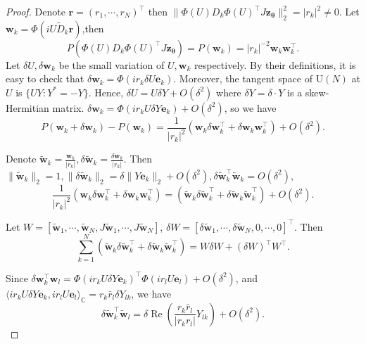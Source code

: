 \documentclass[10pt,a4paper]{amsart}
\newcommand{\CC}{\mathbb{C}}
\begin{document}
\begin{proof}
    Denote $\bm r=(r_1,\cdots,r_N)^\top$ then $\|\Phi(U) D_k\Phi(U)^\top J\bm{z}_{\bm\theta}\|_2^2=|r_k|^2\neq 0$. Let $\bm{w}_k=\Phi(iU\tilde D_k\bm r)$,then
\begin{equation}
    P(\Phi(U) D_k\Phi(U)^\top J\bm{z}_{\bm\theta})=P(\bm{w}_k)=|r_k|^{-2}\bm{w}_k\bm{w}_k^\top.
\end{equation}
 Let $\delta U,\delta\bm{w}_k$ be the small variation of $U,\bm{w}_k$ respectively. By their definitions, it is easy to check that $\delta\bm{w}_k=\Phi(ir_k\delta U\bm e_k)$. Moreover, the tangent space of $\mathrm U(N)$ at $U$ is $\{UY:Y^*=-Y\}$. Hence, $\delta U=U\delta Y+O(\delta^2)$ where $\delta Y=\delta\cdot Y$ is a skew-Hermitian matrix.  $\delta\bm{w}_k=\Phi(ir_kU\delta Y\bm e_k)+O(\delta^2)$, so we have 
\begin{equation}
\label{eq:Project error}
    P(\bm{w}_k+\delta\bm{w}_k)-P(\bm{w}_k)=\frac{1}{|r_k|^2}(\bm{w}_k\delta\bm{w}_k^\top+\delta\bm{w}_k\bm{w}_k^\top)+O(\delta^2).
\end{equation}

Denote $\tilde{\bm{w}}_k=\frac{\bm{w}_k}{|r_k|},\delta\tilde{\bm{w}}_k=\frac{\delta\bm{w}_k}{|r_k|}$. Then $\|\tilde{\bm{w}}_k\|_2=1,\|\delta\tilde{\bm{w}}_k\|_2=\delta\|Y\bm e_k\|_2+O(\delta^2),\delta\tilde{\bm{w}}_k^\top\tilde{\bm{w}}_k=O(\delta^2)$, 
\begin{equation}
    \frac{1}{|r_k|^2}(\bm{w}_k\delta\bm{w}_k^\top+\delta\bm{w}_k\bm{w}_k^\top)=(\tilde{\bm{w}}_k\delta\tilde{\bm{w}}_k^\top+\delta\tilde{\bm{w}}_k\tilde{\bm{w}}_k^\top)+O(\delta^2).
\end{equation}

Let $W=[\tilde{\bm{w}}_1,\cdots,\tilde{\bm{w}}_N, J\tilde{\bm{w}}_1,\cdots,J\tilde{\bm{w}}_N]$, $\delta W=[\delta\tilde{\bm{w}}_1,\cdots,\delta\tilde{\bm{w}}_N,0,\cdots,0]^\top$. Then 
\begin{equation}
\label{eq:error matrix form}
   \sum\limits_{k=1}^N(\tilde{\bm{w}}_k\delta\tilde{\bm{w}}_k^\top+\delta\tilde{\bm{w}}_k\tilde{\bm{w}}_k^\top)=W\delta W+(\delta W)^\top W^\top.
\end{equation}

 Since $\delta\bm{w}_k^\top\bm{w}_l=\Phi(ir_kU\delta Y\bm e_k)^\top\Phi(ir_lU\bm e_l)+O(\delta^2)$, and $\langle ir_kU\delta Y\bm e_k,ir_l U\bm e_l\rangle_{\CC}=r_k\bar r_l\delta Y_{lk}$, we have
 \begin{equation}
     \delta\tilde{\bm{w}}_k^\top\tilde{\bm{w}}_l=\delta\operatorname{Re}(\frac{r_k\bar r_l}{|r_kr_l|}Y_{lk})+O(\delta^2).
 \end{equation}


\end{proof}
\end{document}
